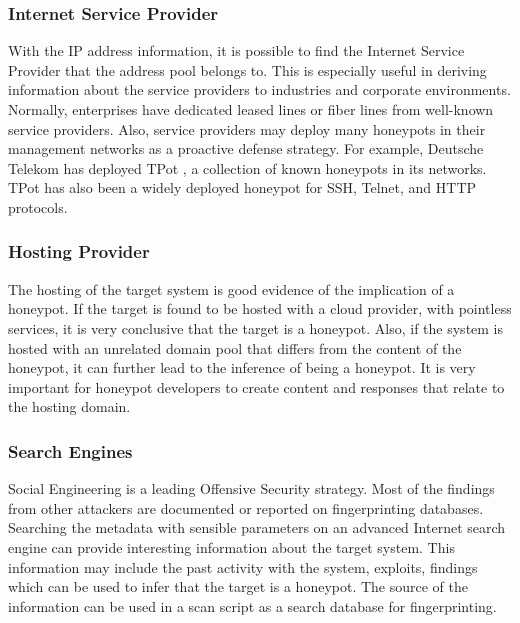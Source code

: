 \subsubsection{Internet Service Provider}
With the IP address information, it is possible to find the Internet Service Provider that the address pool belongs to. This is especially useful in deriving information about the service providers to industries and corporate environments. Normally, enterprises have dedicated leased lines or fiber lines from well-known service providers. Also, service providers may deploy many honeypots in their management networks as a proactive defense strategy. For example, Deutsche Telekom has deployed TPot \cite{TPot}, a collection of known honeypots in its networks. TPot has also been a widely deployed honeypot for SSH, Telnet, and HTTP protocols. 

\subsubsection{Hosting Provider}
The hosting of the target system is good evidence of the implication of a honeypot. If the target is found to be hosted with a cloud provider, with pointless services, it is very conclusive that the target is a honeypot. Also, if the system is hosted with an unrelated domain pool that differs from the content of the honeypot, it can further lead to the inference of being a honeypot. It is very important for honeypot developers to create content and responses that relate to the hosting domain. 

\subsubsection{Search Engines}
Social Engineering is a leading Offensive Security strategy.  Most of the findings from other attackers are documented or reported on fingerprinting databases. Searching the metadata with sensible parameters on an advanced Internet search engine can provide interesting information about the target system. This information may include the past activity with the system, exploits, findings which can be used to infer that the target is a honeypot. The source of the information can be used in a scan script as a search database for fingerprinting.

